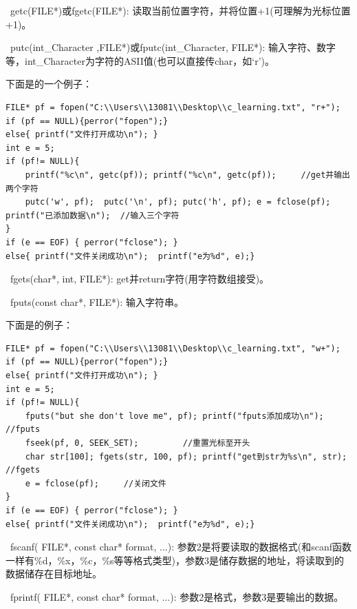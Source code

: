 \documentclass[zihao=-4,UTF8]{report}
\begin{document}
\ getc(FILE*)或fgetc(FILE*): 读取当前位置字符，并将位置+1(可理解为光标位置+1)。\par
{}\ putc(int\_Character ,FILE*)或fputc(int\_Character, FILE*): 输入字符、数字等，int\_Character为字符的ASII值(也可以直接传char，如‘r’)。\par
下面是的一个例子：
\begin{lstlisting}
FILE* pf = fopen("C:\\Users\\13081\\Desktop\\c_learning.txt", "r+");
if (pf == NULL){perror("fopen");}
else{ printf("文件打开成功\n"); }
int e = 5;
if (pf!= NULL){ 
    printf("%c\n", getc(pf)); printf("%c\n", getc(pf));		//get并输出两个字符
    putc('w', pf); 	putc('\n', pf);	putc('h', pf); e = fclose(pf); printf("已添加数据\n");  //输入三个字符
}
if (e == EOF) { perror("fclose"); }
else{ printf("文件关闭成功\n");  printf("e为%d", e);} 
\end{lstlisting}\par
{}\ fgets(char*, int, FILE*): get并return字符(用字符数组接受)。\par
{}\ fputs(const char*, FILE*): 输入字符串。\par
下面是的例子：
\begin{lstlisting}
FILE* pf = fopen("C:\\Users\\13081\\Desktop\\c_learning.txt", "w+");
if (pf == NULL){perror("fopen");}
else{ printf("文件打开成功\n"); }
int e = 5;
if (pf!= NULL){ 
    fputs("but she don't love me", pf); printf("fputs添加成功\n");		//fputs
    fseek(pf, 0, SEEK_SET);			//重置光标至开头
    char str[100]; fgets(str, 100, pf); printf("get到str为%s\n", str);		//fgets
    e = fclose(pf);		//关闭文件
}
if (e == EOF) { perror("fclose"); }
else{ printf("文件关闭成功\n");  printf("e为%d", e);}
\end{lstlisting}
\par
{}\ fscanf( FILE*, const char* format, ...): 参数2是将要读取的数据格式(和scanf函数一样有\%d，\%x，\%c，\%s等等格式类型)，参数3是储存数据的地址，将读取到的数据储存在目标地址。\par
{}\ fprintf( FILE*, const char* format, ...): 参数2是格式，参数3是要输出的数据。\par
\end{document}
